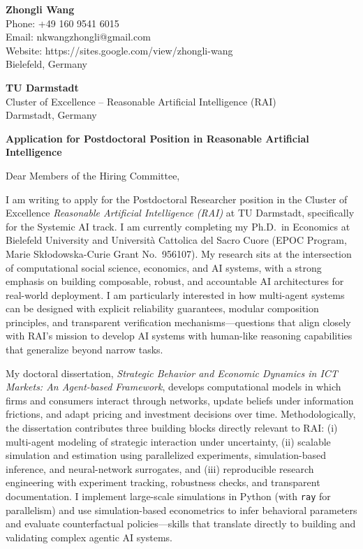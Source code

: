 \documentclass[11pt]{article}
\begin{document}
\noindent
\textbf{Zhongli Wang} \\
Phone: +49 160 9541 6015 \\
Email: nkwangzhongli@gmail.com \\
Website: https://sites.google.com/view/zhongli-wang \\
Bielefeld, Germany \\

\vspace{0.5cm}

\noindent
\textbf{TU Darmstadt} \\
Cluster of Excellence -- Reasonable Artificial Intelligence (RAI) \\
Darmstadt, Germany \\

\vspace{0.5cm}

\noindent
\textbf{Application for Postdoctoral Position in Reasonable Artificial Intelligence} \\

\vspace{0.3cm}

\noindent Dear Members of the Hiring Committee,

I am writing to apply for the Postdoctoral Researcher position in the Cluster of Excellence \textit{Reasonable Artificial Intelligence (RAI)} at TU Darmstadt, specifically for the Systemic AI track. 
I am currently completing my Ph.D.\ in Economics at Bielefeld University and Università Cattolica del Sacro Cuore (EPOC Program, Marie Skłodowska-Curie Grant No.~956107). 
My research sits at the intersection of computational social science, economics, and AI systems, with a strong emphasis on building composable, robust, and accountable AI architectures for real-world deployment. 
I am particularly interested in how multi-agent systems can be designed with explicit reliability guarantees, modular composition principles, and transparent verification mechanisms—questions that align closely with RAI's mission to develop AI systems with human-like reasoning capabilities that generalize beyond narrow tasks.

My doctoral dissertation, \textit{Strategic Behavior and Economic Dynamics in ICT Markets: An Agent-based Framework}, develops computational models in which firms and consumers interact through networks, update beliefs under information frictions, and adapt pricing and investment decisions over time. 
Methodologically, the dissertation contributes three building blocks directly relevant to RAI: 
(i) multi-agent modeling of strategic interaction under uncertainty, 
(ii) scalable simulation and estimation using parallelized experiments, simulation-based inference, and neural-network surrogates, and 
(iii) reproducible research engineering with experiment tracking, robustness checks, and transparent documentation. 
I implement large-scale simulations in Python (with \texttt{ray} for parallelism) and use simulation-based econometrics to infer behavioral parameters and evaluate counterfactual policies—skills that translate directly to building and validating complex agentic AI systems.
\end{document}
